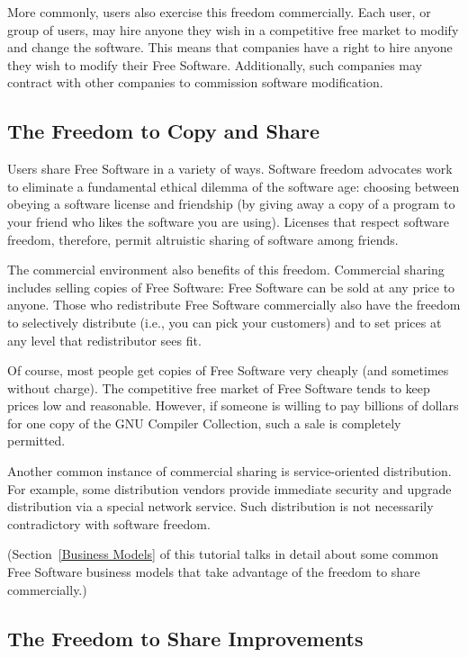 More commonly, users also exercise this freedom commercially.  Each user, or
group of users, may hire anyone they wish in a competitive free market to
modify and change the software.  This means that companies have a right to
hire anyone they wish to modify their Free Software.  Additionally, such
companies may contract with other companies to commission software
modification.

\subsection{The Freedom to Copy and Share}

Users share Free Software in a variety of ways. Software freedom advocates
work to eliminate a fundamental ethical dilemma of the software age: choosing
between obeying a software license and friendship (by giving away a copy of a
program to your friend who likes the software you are using). Licenses that
respect software freedom, therefore, permit altruistic sharing of software
among friends.

The commercial environment also benefits of this freedom.  Commercial sharing
includes selling copies of Free Software: Free Software can be sold at any
price to anyone.  Those who redistribute Free Software commercially also have
the freedom to selectively distribute (i.e., you can pick your customers) and
to set prices at any level that redistributor sees fit.

Of course, most people get copies of Free Software very cheaply (and
sometimes without charge).  The competitive free market of Free Software
tends to keep prices low and reasonable.  However, if someone is willing to
pay billions of dollars for one copy of the GNU Compiler Collection, such a
sale is completely permitted.

Another common instance of commercial sharing is service-oriented
distribution.  For example, some distribution vendors provide immediate
security and upgrade distribution via a special network service.  Such
distribution is not necessarily contradictory with software freedom.

(Section~\ref{Business Models} of this tutorial talks in detail about some
common Free Software business models that take advantage of the freedom to
share commercially.)

\subsection{The Freedom to Share Improvements}

